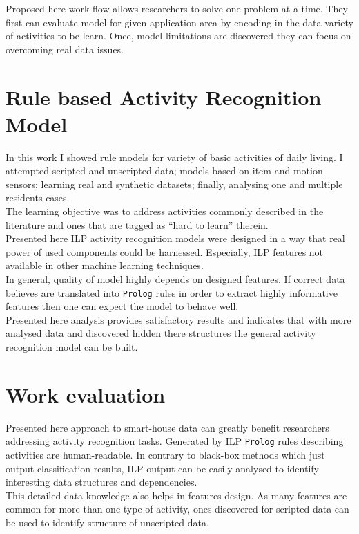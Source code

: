 \documentclass[10pt, a4paper, pdflatex, leqno, twoside, openright]{report}
\begin{document}
Proposed here work-flow allows researchers to solve one problem at a time. They first can evaluate model for given application area by encoding in the data variety of activities to be learn. Once, model limitations are discovered they can focus on overcoming real data issues.

  \section{Rule based Activity Recognition Model}
In this work I showed rule models for variety of basic activities of daily living. I attempted scripted and unscripted data; models based on item and motion sensors; learning real and synthetic datasets; finally, analysing one and multiple residents cases.\\
The learning objective was to address activities commonly described in the literature and ones that are tagged as ``hard to learn'' therein.\\

Presented here ILP activity recognition models were designed in a way that real power of used components could be harnessed. Especially, ILP features not available in other machine learning techniques.\\
In general, quality of model highly depends on designed features. If correct data believes are translated into \texttt{Prolog} rules in order to extract highly informative features then one can expect the model to behave well.\\
Presented here analysis provides satisfactory results and indicates that with more analysed data and discovered hidden there structures the general activity recognition model can be built.

  \section{Work evaluation} %
Presented here approach to smart-house data can greatly benefit researchers addressing activity recognition tasks. Generated by ILP \texttt{Prolog} rules describing activities are human-readable. In contrary to black-box methods which just output classification results, ILP output can be easily analysed to identify interesting data structures and dependencies.\\
This detailed data knowledge also helps in features design. As many features are common for more than one type of activity, ones discovered for scripted data can be used to identify structure of unscripted data.\\
\end{document}
